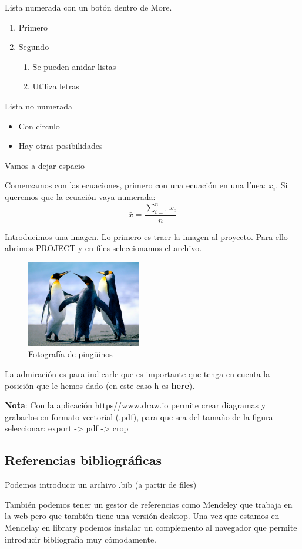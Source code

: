 \documentclass[a4paper]{article}
\begin{document}
Lista numerada con un botón dentro de More.
\begin{enumerate}
\item Primero
\item Segundo
\begin{enumerate}
\item Se pueden anidar listas
\item Utiliza letras
\end{enumerate}
\end{enumerate}

Lista no numerada
\begin{itemize}
\item Con circulo
\item Hay otras posibilidades
\end{itemize}

Vamos a dejar espacio
\vspace{1cm}

Comenzamos con las ecuaciones, primero con una ecuación en una línea: \(x_i\). Si queremos que la ecuación vaya numerada:
\[\bar{x} = \frac{\sum_{i=1}^n x_i}{n}\]

Introducimos una imagen. Lo primero es traer la imagen al proyecto. Para ello abrimos PROJECT y en files seleccionamos el archivo.
\begin{figure}[h!]
\centering
\includegraphics[width=5cm]{Penguins.jpg}
\caption{Fotografía de ping\"uinos}
\end{figure}
La admiración es para indicarle que es importante que tenga en cuenta la posición que le hemos dado (en este caso h es \textbf{here}).

\textbf{Nota}:  
Con la aplicación https//www.draw.io permite crear diagramas y grabarlos en formato vectorial (.pdf), para que sea del tamaño de la figura seleccionar: export -> pdf -> crop


\subsection{Referencias bibliográficas}

Podemos introducir un archivo .bib (a partir de files)

También podemos tener un gestor de referencias como Mendeley que trabaja en la web pero que también tiene una versión desktop. Una vez que estamos en Mendelay en library podemos instalar un complemento al navegador que permite introducir bibliografía muy cómodamente.



\end{document}
